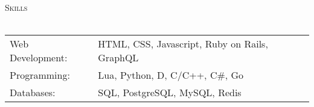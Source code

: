 \documentclass[a4paper]{article}
\newcommand{\lineunder} {
    \vspace*{-8pt} \\
    \hspace*{-18pt} \hrulefill \\
}
\newcommand{\header} [1] {
    {\hspace*{-18pt}\vspace*{6pt} \textsc{#1}}
    \vspace*{-6pt} \lineunder
}
\begin{document}
\header{Skills}
\begin{tabular}{ l l }
	Web Development: & HTML, CSS, Javascript, Ruby on Rails, GraphQL \\
	Programming:     & Lua, Python, D, C/C++, C\#, Go                \\
	Databases:       & SQL, PostgreSQL, MySQL, Redis                 \\
\end{tabular}
\vspace{2mm}





\ 
\end{document}

